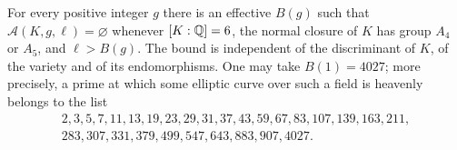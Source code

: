 \begin{theorem}\label{dir:thm:heavenlysextic}
For every positive integer $g$ there is an effective $B(g)$ such that
$\mathcal A(K,g,\ell)=\varnothing$ whenever $[K:\mathbb{Q}]=6$, the normal closure of $K$ has
group $A_4$ or $A_5$, and $\ell>B(g)$. The bound is independent of the discriminant of
$K$, of the variety and of its endomorphisms. One may take $B(1)=4027$; more precisely,
a prime at which some elliptic curve over such a field is heavenly belongs to the list
\begin{equation}\label{dir:eq:heavenlylist}
\begin{gathered}
 2,3,5,7,11,13,19,23,29,31,37,43,59,67,83,107,139,163,211,\\
 283,307,331,379,499,547,643,883,907,4027 .
\end{gathered}
\end{equation}
\end{theorem}

